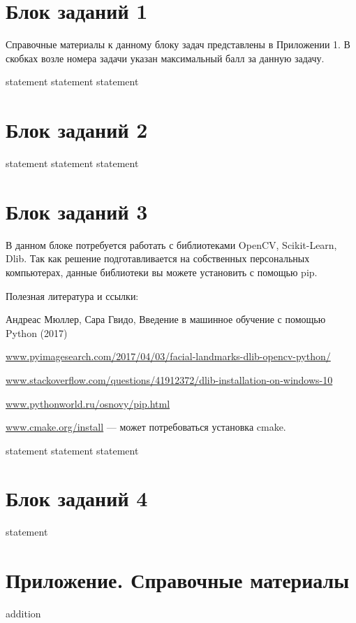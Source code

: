 \section{Блок заданий 1}

Справочные материалы к данному блоку задач представлены в Приложении 1. В скобках возле номера задачи указан максимальный балл за данную задачу.

{statement}
{statement}
{statement}

\section{Блок заданий 2}

{statement}
{statement}
{statement}

\section{Блок заданий 3}

В данном блоке потребуется работать с библиотеками OpenCV, Scikit-Learn, Dlib. Так как решение подготавливается на собственных персональных компьютерах, данные библиотеки вы можете установить с помощью pip.

Полезная литература и ссылки:

Андреас Мюллер, Сара Гвидо, Введение в машинное обучение с помощью Python (2017)

\url{www.pyimagesearch.com/2017/04/03/facial-landmarks-dlib-opencv-python/}

\url{www.stackoverflow.com/questions/41912372/dlib-installation-on-windows-10}

\url{www.pythonworld.ru/osnovy/pip.html}

\url{www.cmake.org/install} — может потребоваться установка cmake.

{statement}
{statement}
{statement}

\section{Блок заданий 4}

{statement}

\section{Приложение. Справочные материалы}

{addition}